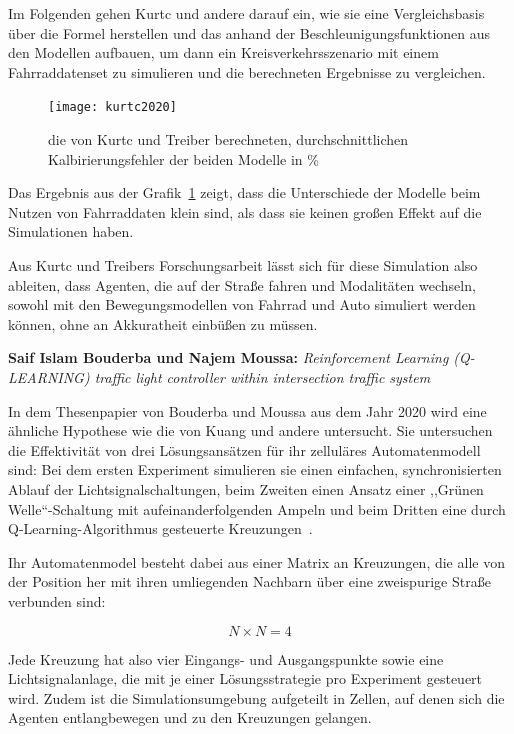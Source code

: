 Im Folgenden gehen Kurtc und andere darauf ein, wie sie eine Vergleichsbasis über die Formel herstellen und das anhand der Beschleunigungsfunktionen aus den Modellen aufbauen, um dann ein Kreisverkehrsszenario mit einem Fahrraddatenset zu simulieren und die berechneten Ergebnisse zu vergleichen.

\begin{figure}[h]
    \centering
    \texttt{[image: kurtc2020]}~\caption{die von Kurtc und Treiber berechneten, durchschnittlichen Kalbirierungsfehler der beiden Modelle in \%~\cite[S. 24]{Kurtc2020}}
    \label{fig:kurtc2020}
\end{figure}

Das Ergebnis aus der Grafik~\ref{fig:kurtc2020} zeigt, dass die Unterschiede der Modelle beim Nutzen von Fahrraddaten klein sind, als dass sie keinen großen Effekt auf die Simulationen haben.

Aus Kurtc und Treibers Forschungsarbeit lässt sich für diese Simulation also ableiten, dass Agenten, die auf der Straße fahren und Modalitäten wechseln, sowohl mit den Bewegungsmodellen von Fahrrad und Auto simuliert werden können, ohne an Akkuratheit einbüßen zu müssen.


\textbf{Saif Islam Bouderba und Najem Moussa:}
\textit{Reinforcement Learning (Q-LEARNING) traffic light controller within intersection traffic system}

In dem Thesenpapier von Bouderba und Moussa aus dem Jahr 2020 wird eine ähnliche Hypothese wie die von Kuang und andere untersucht.
Sie untersuchen die Effektivität von drei Lösungsansätzen für ihr zelluläres Automatenmodell sind:
Bei dem ersten Experiment simulieren sie einen einfachen, synchronisierten Ablauf der Lichtsignalschaltungen, beim Zweiten einen Ansatz einer ,,Grünen Welle``-Schaltung mit aufeinanderfolgenden Ampeln und beim Dritten eine durch Q-Learning-Algorithmus gesteuerte Kreuzungen~\cite[S. 2]{Bouderba2019}.

Ihr Automatenmodel besteht dabei aus einer Matrix an Kreuzungen, die alle von der Position her mit ihren umliegenden Nachbarn über eine zweispurige Straße verbunden sind:

\[N \times N = 4\]

Jede Kreuzung hat also vier Eingangs- und Ausgangspunkte sowie eine Lichtsignalanlage, die mit je einer Lösungsstrategie pro Experiment gesteuert wird.
Zudem ist die Simulationsumgebung aufgeteilt in Zellen, auf denen sich die Agenten entlangbewegen und zu den Kreuzungen gelangen\cite[S. 2]{Bouderba2019}.

